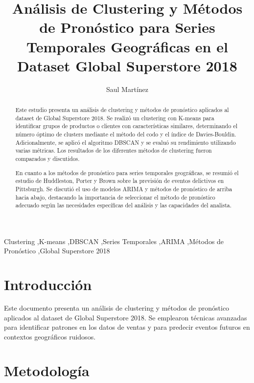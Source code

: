 \documentclass[preprint,12pt]{elsarticle}
\begin{document}
\begin{frontmatter}

\title{Análisis de Clustering y Métodos de Pronóstico para Series Temporales Geográficas en el Dataset Global Superstore 2018}

\author[1]{Saul Martínez}


\begin{abstract}
Este estudio presenta un análisis de clustering y métodos de pronóstico aplicados al dataset de Global Superstore 2018. Se realizó un clustering con K-means para identificar grupos de productos o clientes con características similares, determinando el número óptimo de clusters mediante el método del codo y el índice de Davies-Bouldin. Adicionalmente, se aplicó el algoritmo DBSCAN y se evaluó su rendimiento utilizando varias métricas. Los resultados de los diferentes métodos de clustering fueron comparados y discutidos.

En cuanto a los métodos de pronóstico para series temporales geográficas, se resumió el estudio de Huddleston, Porter y Brown sobre la previsión de eventos delictivos en Pittsburgh. Se discutió el uso de modelos ARIMA y métodos de pronóstico de arriba hacia abajo, destacando la importancia de seleccionar el método de pronóstico adecuado según las necesidades específicas del análisis y las capacidades del analista.

\end{abstract}

\begin{keyword}
Clustering \sep K-means \sep DBSCAN \sep Series Temporales \sep ARIMA \sep Métodos de Pronóstico \sep Global Superstore 2018
\end{keyword}

\end{frontmatter}

\section{Introducción}
Este documento presenta un análisis de clustering y métodos de pronóstico aplicados al dataset de Global Superstore 2018. Se emplearon técnicas avanzadas para identificar patrones en los datos de ventas y para predecir eventos futuros en contextos geográficos ruidosos.

\section{Metodología}
\end{document}

